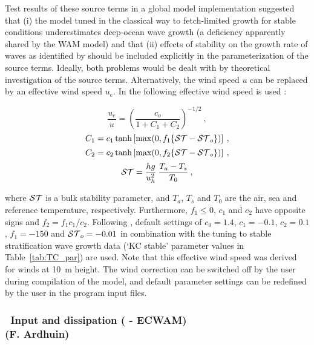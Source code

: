 Test results of these source terms in a global model implementation
\citep{tol:OMB02a} suggested that (i) the model tuned in the classical way to
fetch-limited growth for stable conditions underestimates deep-ocean wave
growth (a deficiency apparently shared by the WAM model) and that (ii) effects
of stability on the growth rate of waves as identified by
\cite{art:KC92,ibk:KC94} should be included explicitly in the parameterization
of the source terms.  Ideally, both problems would be dealt with by
theoretical investigation of the source terms. Alternatively, the wind speed
$u$ can be replaced by an effective wind speed $u_e$. In \cite{tol:OMB02a} the
following effective wind speed is used :


\begin{equation}
\frac{u_e}{u} = \left ( \frac{c_o}{1 + C_1 + C_2} \right )^{-1/2}
\: , \label{eq:scor} \end{equation} \begin{equation}
C_1 = c_1 \tanh \left [ \max ( 0 , f_1 \{ {\cal ST} - {\cal ST}_o \} ) \right ]
\: , \label{eq:c1} \end{equation} \begin{equation}
C_2 = c_2 \tanh \left [ \max ( 0 , f_2 \{ {\cal ST} - {\cal ST}_o \} ) \right ]
\: , \label{eq:c2} \end{equation} \begin{equation}
{\cal ST} = \frac{h g}{u_h^2} \: \frac{T_a - T_s}{T_0}
\: , \label{eq:stab} \end{equation}

\noindent
where ${\cal ST}$ is a bulk stability parameter, and $T_a$, $T_s$ and $T_0$ are the
air, sea and reference temperature, respectively. Furthermore, $f_1 \leq 0$,
$c_1$ and $c_2$ have opposite signs and $f_2 = f_1 c_1 / c_2$. Following
\cite{tol:OMB02a}, default settings of $c_0 = 1.4$, $c_1 = -0.1$, $c_2 = 0.1$,
$f_1 = -150$ and ${\cal ST}_o = -0.01$ in combination with the tuning to stable
stratification wave growth data (`KC stable' parameter values in
Table~\ref{tab:TC_par}) are used. Note that this effective wind speed was
derived for winds at 10~m height. The wind correction can be switched off by
the user during compilation of the model, and default parameter settings can
be redefined by the user in the program input files.

\vsssub
\subsubsection{~Input and dissipation ( - ECWAM) \\
\hfill {\rm (F. Ardhuin)}} \label{sec:wam4}
\vsssub

